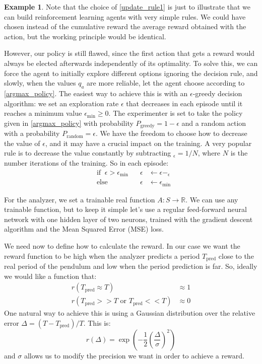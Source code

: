 \documentclass[11pt,a4paper,twoside]{report}
\newcommand{\+}{\textnormal{+} }
\theoremstyle{definition}
\newtheorem{myex}[mythm]{Example}
\numberwithin{equation}{chapter}
\begin{document}
\begin{myex}
Note that the choice of \eqref{update_rule1} is just to illustrate that we can
build reinforcement learning agents with very simple rules. We could have
chosen instead of the cumulative reward the average reward obtained with the 
action, but the working principle would be identical.

However, our policy is still flawed, since the first action that gets a reward
would always be elected afterwards independently of its optimality. To solve
this, we can force the agent to initially explore different options ignoring the
decision rule, and slowly, when the values $q_a$ are more reliable, let the
agent choose according to \eqref{argmax_policy}. The easiest way to achieve this
is with an $\epsilon$-greedy decision algorithm: we set an exploration rate
$\epsilon$ that decreases in each episode until it reaches a minimum value
$\epsilon_\text{min}\geq 0$. The experimenter is set to take the policy given in
\eqref{argmax_policy} with probability $P_{\text{greedy}}=1-\epsilon$
and a random action with a probability $P_{\text{random}}=\epsilon$. We have
the freedom to choose how to decrease the value of $\epsilon$, and it may have a
crucial impact on the training. A very popular rule is to decrease the value
constantly by subtracting $_\epsilon = 1/N$, where $N$ is the number iterations
of the training. So in each episode:
\begin{align}
  &\text{if}\; \; \epsilon > \epsilon_\text{min} \;\;\; &\epsilon&\leftarrow\epsilon - _\epsilon \\
  &\text{else} \; \;  &\epsilon &\leftarrow \epsilon_\text{min}
\end{align} 


For the analyzer, we set a trainable real function $A: S \rightarrow
\mathbb{R}$. We can use any trainable function, but to keep it simple let's use
a regular feed-forward neural network with one hidden layer of two neurons,
trained with the gradient descent algorithm and the Mean
Squared Error (MSE) loss.

We need now to define how to calculate the reward.  In our case we want the
reward function to be high when the analyzer predicts a period $T_\text{pred}$
close to the real period of the pendulum and low when the period prediction is
far. So, ideally we would like a function that:
\begin{align}
       r(T_{\text{pred}} \approx T) &\approx 1\\
       r(T_{\text{pred}}>> T \text{ or } T_{\text{pred}} << T) & \approx 0
\end{align}
One natural way to achieve this is using a Gaussian distribution over the
relative error $\Delta=(T-T_{\text{pred}})/T$. This is:
\begin{equation}
   r(\Delta)=\exp\left(-\frac{1}{2}\left( \frac{\Delta}{\sigma} \right) ^2\right)
  \label{gaussian_reward}
\end{equation}
and $\sigma$ allows us to modify the precision we want in order to achieve a 
reward.


\end{myex}
\end{document}
